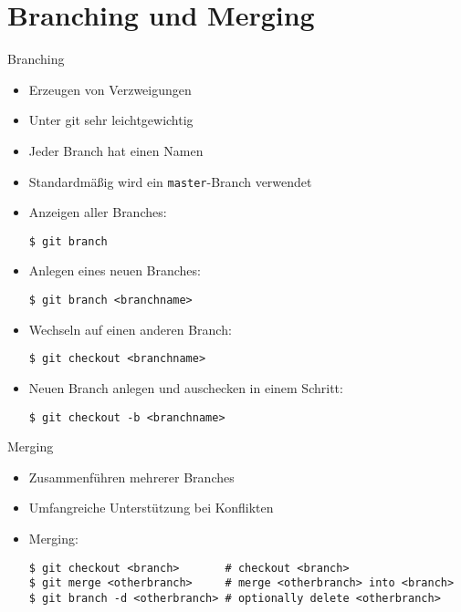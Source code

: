 \section{Branching und Merging}

\begin{frame}
  \tableofcontents[currentsection]
\end{frame}

\begin{frame}{Branching}
  \begin{itemize}
    \item Erzeugen von Verzweigungen
    \item Unter git sehr leichtgewichtig
    \item Jeder Branch hat einen Namen
    \item Standardmäßig wird ein \texttt{master}-Branch verwendet
    \framebreak

    \item Anzeigen aller Branches:
    \begin{lstlisting}
$ git branch
    \end{lstlisting}
    \item Anlegen eines neuen Branches:
    \begin{lstlisting}
$ git branch <branchname>
    \end{lstlisting}
    \item Wechseln auf einen anderen Branch:
    \begin{lstlisting}
$ git checkout <branchname>
    \end{lstlisting}
    \item Neuen Branch anlegen und auschecken in einem Schritt:
    \begin{lstlisting}
$ git checkout -b <branchname>
    \end{lstlisting}

  \end{itemize}

\end{frame}

\begin{frame}{Merging}
  \begin{itemize}
    \item Zusammenführen mehrerer Branches
    \item Umfangreiche Unterstützung bei Konflikten
    \item Merging:
    \begin{lstlisting}
$ git checkout <branch>       # checkout <branch>
$ git merge <otherbranch>     # merge <otherbranch> into <branch>
$ git branch -d <otherbranch> # optionally delete <otherbranch>
    \end{lstlisting}
  \end{itemize}
\end{frame}


